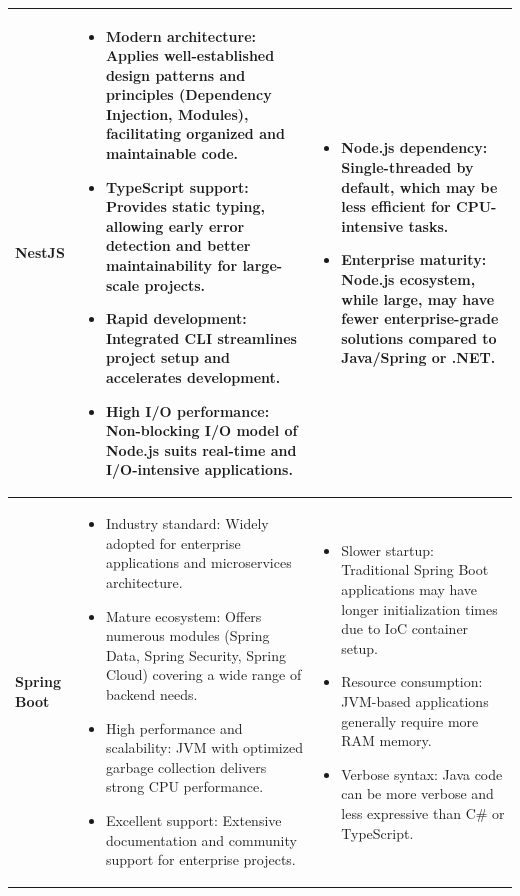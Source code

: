 \begin{longtable}{|l|p{6cm}|p{6cm}|}
\textbf{NestJS} &
\begin{itemize}[leftmargin=*,noitemsep,nolistsep]
    \item Modern architecture: Applies well-established design patterns and principles (Dependency Injection, Modules), facilitating organized and maintainable code.
    \item TypeScript support: Provides static typing, allowing early error detection and better maintainability for large-scale projects.
    \item Rapid development: Integrated CLI streamlines project setup and accelerates development.
    \item High I/O performance: Non-blocking I/O model of Node.js suits real-time and I/O-intensive applications.
\end{itemize} &
\begin{itemize}[leftmargin=*,noitemsep,nolistsep]
    \item Node.js dependency: Single-threaded by default, which may be less efficient for CPU-intensive tasks.
    \item Enterprise maturity: Node.js ecosystem, while large, may have fewer enterprise-grade solutions compared to Java/Spring or .NET.
\end{itemize} \\
\hline

\textbf{Spring Boot} &
\begin{itemize}[leftmargin=*,noitemsep,nolistsep]
    \item Industry standard: Widely adopted for enterprise applications and microservices architecture.
    \item Mature ecosystem: Offers numerous modules (Spring Data, Spring Security, Spring Cloud) covering a wide range of backend needs.
    \item High performance and scalability: JVM with optimized garbage collection delivers strong CPU performance.
    \item Excellent support: Extensive documentation and community support for enterprise projects.
\end{itemize} &
\begin{itemize}[leftmargin=*,noitemsep,nolistsep]
    \item Slower startup: Traditional Spring Boot applications may have longer initialization times due to IoC container setup.
    \item Resource consumption: JVM-based applications generally require more RAM memory.
    \item Verbose syntax: Java code can be more verbose and less expressive than C\# or TypeScript.
\end{itemize} \\
\hline

\end{longtable}


